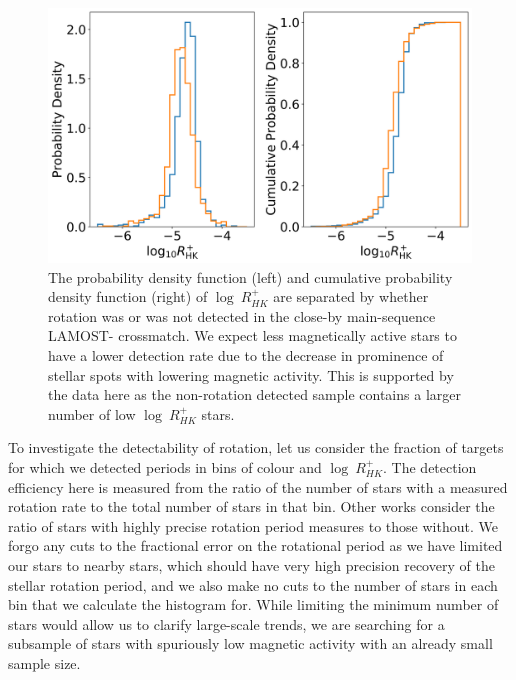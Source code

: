 \begin{figure}
\centering
  \includegraphics[width=\textwidth]{Figures/rot_gap_figures/pdf_cdf.png}
  \caption{
  	The probability density function (left) and cumulative probability density function (right) of $\log \ R^{+}_{HK}$ are separated by whether rotation was or was not detected in the close-by main-sequence LAMOST-\kepler{} crossmatch. 
	We expect less magnetically active stars to have a lower detection rate due to the decrease in prominence of stellar spots with lowering magnetic activity.
 This is supported by the data here as the non-rotation detected sample contains a larger number of low $\log \ R^{+}_{HK}$ stars.}
  \label{fig:pdf_cdf}
\end{figure}

To investigate the detectability of rotation, let us consider the fraction of targets for which we detected periods in bins of colour and $\log \ R^{+}_{HK}$.
The detection efficiency here is measured from the ratio of the number of stars with a measured rotation rate to the total number of stars in that bin.
Other works \citep[See e.g.]{claytor_recovery_2022} consider the ratio of stars with highly precise rotation period measures to those without.
We forgo any cuts to the fractional error on the rotational period as we have limited our stars to nearby stars, which should have very high precision recovery of the stellar rotation period, and we also make no cuts to the number of stars in each bin that we calculate the histogram for. 
While limiting the minimum number of stars would allow us to clarify large-scale trends, we are searching for a subsample of stars with spuriously low magnetic activity with an already small sample size.


